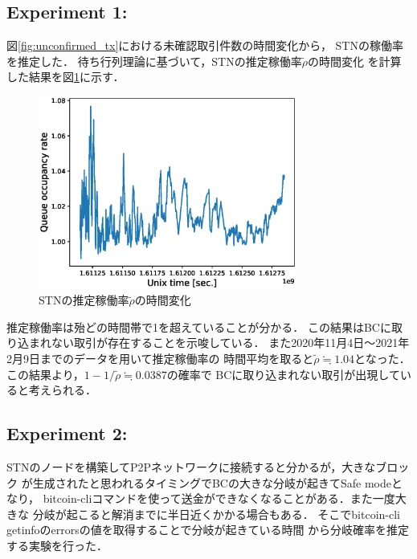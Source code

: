 \documentclass[graybox]{svmult}
\begin{document}
\subsection{Experiment 1: }


図\ref{fig:unconfirmed_tx}における未確認取引件数の時間変化から，
STNの稼働率を推定した．
待ち行列理論に基づいて，STNの推定稼働率$\tilde{\rho}$の時間変化
を計算した結果を図\ref{fig:occupancyrate}に示す．
%
\begin{figure}[tb]
  \vspace{-20mm}
  \begin{center}
    \includegraphics[width=85mm]{bsv_stn-rho-queue_occupancy_rate.eps}
  \end{center}
  \vspace{20mm}
  \caption{STNの推定稼働率$\tilde{\rho}$の時間変化}
  \label{fig:occupancyrate}
\end{figure}
%
推定稼働率は殆どの時間帯で1を超えていることが分かる．
この結果はBCに取り込まれない取引が存在することを示唆している．
また2020年11月4日〜2021年2月9日までのデータを用いて推定稼働率の
時間平均を取ると$\tilde{\rho} \fallingdotseq 1.04$となった．
この結果より，$1-1/\tilde{\rho} \fallingdotseq 0.0387$の確率で
BCに取り込まれない取引が出現していると考えられる．




\subsection{Experiment 2: }


STNのノードを構築してP2Pネットワークに接続すると分かるが，大きなブロック
が生成されたと思われるタイミングでBCの大きな分岐が起きてSafe modeとなり，
bitcoin-cliコマンドを使って送金ができなくなることがある．また一度大きな
分岐が起こると解消までに半日近くかかる場合もある．
そこでbitcoin-cli getinfoのerrorsの値を取得することで分岐が起きている時間
から分岐確率を推定する実験を行った．
\end{document}
